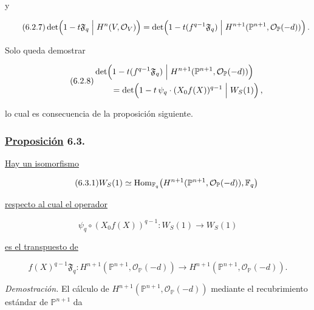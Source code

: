 y

\begin{equation}\tag{6.2.7}
\det\!\left(1-t\mathfrak F_q
\mathrel{\Big|}H^n(V,\mathcal O_V)\right)
=
\det\!\left(
1-t(f^{q-1}\mathfrak F_q)
\mathrel{\Big|}
H^{n+1}(\mathbb P^{n+1},\mathcal O_{\mathbb P}(-d))
\sisi{\right.}{\right)}.
\end{equation}

Solo queda demostrar

\begin{equation}\tag{6.2.8}
\begin{aligned}
&\det\!\left(
1-t(f^{q-1}\mathfrak F_q)
\mathrel{\Big|}
H^{n+1}(\mathbb P^{n+1},\mathcal O_{\mathbb P}(-d))
\sisi{\right.}{\right)}\\
&\qquad=
\det\!\left(
1-t\,\sisi{(}{}\psi_q\cdot(X_0f(X))^{q-1}
\mathrel{\Big|}W_S(1)
\right),
\end{aligned}
\end{equation}

lo cual es consecuencia de la proposición siguiente.

\subsubsection*{\underline{Proposición} 6.3.}
\underline{Hay un isomorfismo}

\begin{equation}\tag{6.3.1}
W_S(1)\simeq
\operatorname{Hom}_{\mathbb F_q}\!\left(
H^{n+1}(\mathbb P^{n+1}\sisi{.}{,}\mathcal O_{\mathbb P}(-d)\sisi{}{)},
\mathbb F_q\right)
\end{equation}

\underline{respecto al cual el operador}

\begin{equation}\tag{6.3.2}
\psi_q\circ(X_0f(X))^{q-1}:W_S(1)\longrightarrow W_S(1)
\end{equation}

\pageoriginale

\underline{es el transpuesto de}

\begin{equation}\tag{6.3.3}
f(X)^{q-1}\mathfrak F_q:
H^{n+1}(\mathbb P^{n+1},\mathcal O_{\mathbb P}(-d))
\longrightarrow
H^{n+1}(\mathbb P^{n+1},\mathcal O_{\mathbb P}(-d)).
\end{equation}

\noindent\emph{Demostración.}
El cálculo de
$H^{n+1}(\mathbb P^{n+1},\mathcal O_{\mathbb P}(-d))$ mediante el
recubrimiento estándar de $\mathbb P^{n+1}$ da

